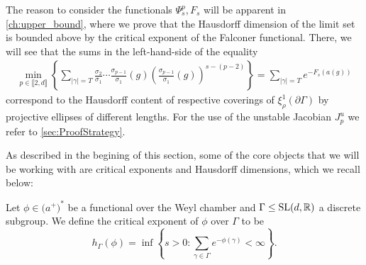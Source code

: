 \documentclass{report}
\begin{document}
\begin{remark}
    The reason to consider the functionals $\Psi_s^p, F_s$ will be apparent in \cref{ch:upper_bound}, where we prove that the Hausdorff dimension of the limit set is bounded above by the critical exponent of the Falconer functional.
    There, we will see that the sums in the left-hand-side of the equality
\begin{align*}
    \min_{p \in \llbracket 2, d \rrbracket} 
    \left\{ 
        \sum_{|\gamma| = T} 
            \frac{\sigma_2}{\sigma_1}\cdots\frac{\sigma_{p-1}}{\sigma_1}(g) 
            \left( \frac{\sigma_{p-1}}{\sigma_1}(g) \right)^{s - (p-2)}
    \right\} = 
    \sum_{|\gamma| = T} e^{-F_s(a(g))}
\end{align*}
correspond to the Hausdorff content of respective coverings of $\xi_\rho^1(\partial \Gamma)$ by projective ellipses of different lengths.
For the use of the unstable Jacobian $J_p^u$ we refer to \cref{sec:ProofStrategy}.
\end{remark}

As described in the begining of this section, some of the core objects that we will be working with are critical exponents and Hausdorff dimensions, which we recall below:
\begin{definition}
    \label{def:functional_critical_exponent}
Let $\phi \in \mathfrak (a^+)^*$ be a functional over the Weyl chamber and $\Gamma \leq \operatorname{{\mathrm{SL}}}(d, \mathbb R)$ a discrete subgroup.
We define the critical exponent of $\phi$ over $\Gamma$ to be
\[
    h_\Gamma(\phi) = \inf
    \left\{
        s > 0: \sum_{\gamma \in \Gamma} e^{-\phi(\gamma)} < \infty
    \right\}.
\]    
\end{definition}
\end{document}
